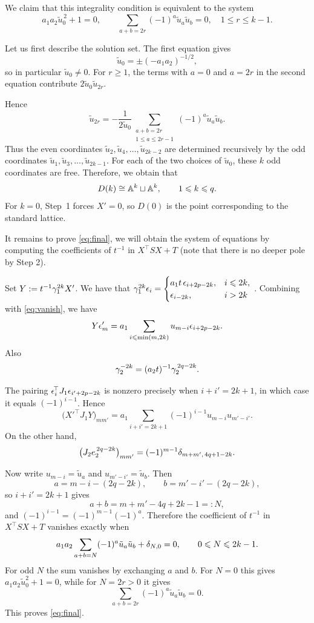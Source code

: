 \documentclass[11pt]{article}
\numberwithin{equation}{section}
\begin{document}
\begin{appendix}
We claim that this integrality condition is equivalent to the system
\begin{equation}\label{eq:final}
a_1a_2\tilde u_0^{\,2}+1=0,
\qquad
\sum_{a+b=2r}(-1)^a\tilde u_a\tilde u_b=0,
\quad 1\leqslant r\leqslant k-1.
\end{equation}

Let us first describe the solution set. The first equation gives
\[
\tilde u_0=\pm(-a_1a_2)^{-1/2},
\]
so in particular $\tilde u_0\neq0$. For $r\geqslant1$, the terms with
$a=0$ and $a=2r$ in the second equation contribute $2\tilde u_0\tilde u_{2r}$.

Hence
\[
\tilde u_{2r}
=
-\frac{1}{2\tilde u_0}
\sum_{\substack{a+b=2r\\1\leqslant a\leqslant2r-1}}
(-1)^a\tilde u_a\tilde u_b.
\]
Thus the even coordinates $\tilde u_2,\tilde u_4,\dots,\tilde u_{2k-2}$ are determined recursively by the odd coordinates $\tilde u_1,\tilde u_3,\dots,\tilde u_{2k-1}$. For each of the two choices of $\tilde u_0$, these $k$ odd coordinates are free. Therefore, we obtain that
\[
D(k)\cong\mathbb{A}^k\sqcup\mathbb{A}^k,
\qquad
1\leqslant k\leqslant q.
\]
For $k=0$, Step~1 forces $X'=0$, so $D(0)$ is the point corresponding to the standard lattice.

It remains to prove \eqref{eq:final}, we will obtain the system of equations by computing the coefficients of $t^{-1}$ in $X^{\!\top}SX+T$ (note that there is no deeper pole by Step 2).

Set $Y:=t^{-1}\gamma_1^{2k}X'$. We have that $\gamma_1^{2k}\epsilon_i=
\begin{cases}
a_1t\,\epsilon_{i+2p-2k},&i\leqslant2k,\\
\epsilon_{i-2k},&i>2k
\end{cases}$
. Combining with \eqref{eq:vanish}, we have
\[
Y\epsilon'_m=a_1\sum_{i\leqslant\min(m,2k)}u_{m-i}\epsilon_{i+2p-2k}.
\]
Also
\[
\gamma_2^{-2k}=(a_2t)^{-1}\gamma_2^{\,2q-2k}.
\]

The pairing $\epsilon_i^{\!\top}J_1\epsilon_{i'+2p-2k}$ is nonzero precisely when $i+i'=2k+1$, in which case it equals $(-1)^{i-1}$. Hence
\[
\bigl(X'^{\!\top}J_1Y\bigr)_{mm'}
=
a_1\sum_{i+i'=2k+1}(-1)^{i-1}u_{m-i}u_{m'-i'}.
\]
On the other hand,
\[
\bigl(J_2e_2^{\,2q-2k}\bigr)_{mm'}
=
(-1)^{m-1}\delta_{m+m',\,4q+1-2k}.
\]

Now write $u_{m-i}=\tilde u_a$ and $u_{m'-i'}=\tilde u_b$. Then
\[
a=m-i-(2q-2k),\qquad b=m'-i'-(2q-2k),
\]
so $i+i'=2k+1$ gives
\[
a+b=m+m'-4q+2k-1=:N,
\]
and $(-1)^{i-1}=(-1)^{m-1}(-1)^a$. Therefore the coefficient of $t^{-1}$ in $X^{\!\top}SX+T$ vanishes exactly when
\begin{equation}\label{eq:quadratic}
a_1a_2\sum_{a+b=N}(-1)^a\tilde u_a\tilde u_b+\delta_{N,0}=0,
\qquad 0\leqslant N\leqslant2k-1.
\end{equation}
For odd $N$ the sum vanishes by exchanging $a$ and $b$. For $N=0$ this gives $a_1a_2\tilde u_0^2+1=0$, while for $N=2r>0$ it gives
\[
\sum_{a+b=2r}(-1)^a\tilde u_a\tilde u_b=0.
\]
This proves \eqref{eq:final}.


\end{appendix}
\end{document}
